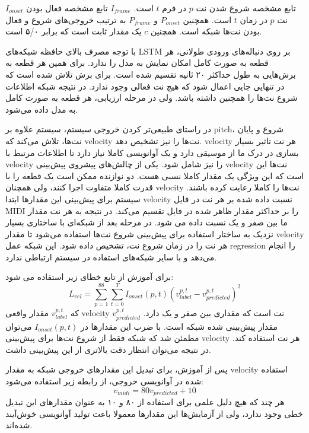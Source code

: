 $I_{onset}$ تابع مشخصه شروع شدن نت $p$ در فرم $t$ است. $I_{frame}$ تابع مشخصه
فعال بودن نت $p$ در زمان $t$ است. همچنین $P_{onset}$ و $P_{frame}$ به ترتیب
خروجی‌های شروع و فعال بودن نت‌ها شبکه است. همچنین $c$ یک مقدار ثابت است که برابر
۵/۰ است.

با توجه مصرف بالای حافظه شبکه‌های \gls{LSTM} بر روی دنباله‌های ورودی طولانی، هر
قطعه به صورت کامل امکان نمایش به مدل را ندارد. برای همین هر قطعه به برش‌هایی به
طول حداکثر ۲۰ ثانیه تقسیم شده است. برای برش تلاش شده است که در تنهایی جایی اعمال
شود که هیچ نت فعالی وجود ندارد. در نتیجه شبکه اطلاعات شروع نت‌ها را همچنین داشته
باشد. ولی در مرحله ارزیابی، هر قطعه به صورت کامل به مدل داده می‌شود.

در راستای طبیعی‌تر کردن خروجی سیستم، سیستم علاوه بر \gls{pitch}، شروع و پایان
نت‌ها، تلاش می‌کند که \gls{velocity} نت‌ها را نیز تشخیص دهد. \gls{velocity} هر
نت تاثیر بسیار بسازی در درک ما از موسیقی دارد و یک آوانویسی کاملا نیاز دارد تا
اطلاعات مرتبط با \gls{velocity} را نیز شامل شود. یکی از چالش‌های پیشروی پیش‌بینی
\gls{velocity} نت‌ها این است که این ویژگی یک مقدار کاملا نسبی هست. دو نوازنده
ممکن است یک قطعه را با قدرت کاملا متفاوت اجرا کنند، ولی همچنان \gls{velocity}
نت‌ها را کاملا رعایت کرده باشند. سیستم برای پیش‌بینی این مقدارها ابتدا
\gls{velocity} نسبت داده شده بر هر نت در فایل \gls{MIDI} را بر حداکثر مقدار ظاهر
شده در فایل تقسیم می‌کند. در نتیجه به هر نت مقدار ما بین صفر و یک نسبت داده می
شود. در مرحله بعد از شبکه‌ای با ساختاری بسیار نزدیک به ساختار استفاده برای
پیش‌بینی شروع نت‌ها استفاده می‌شود تا مقدار \gls{velocity} هر نت را در زمان شروع
نت، تشخیص داده شود. این شبکه عمل \gls{regression} را انجام می‌دهد و با سایر
شبکه‌های استفاده در سیستم ارتباطی ندارد.

برای آموزش از تابع خطای زیر استفاده می شود:
\begin{equation}
    L_{vel} = \sum_{p=1}^{88} \sum_{t=0}^{T} I_{onset}(p, t) (v_{label}^{p,t} - v_{predicted}^{p,t})^{2}
\end{equation}
که $v_{label}^{p, t}$ مقدار واقعی \gls{velocity} نت است که مقداری بین صفر و یک
دارد. $v_{predicted}^{p,t}$ مقدار پیش‌بینی شده شبکه است. با ضرب این مقدارها در
$I_{onset}(p, t)$ می‌توان مطمئن شد که شبکه فقط از شروع نت‌ها برای پیش‌بینی
\gls{velocity} هر نت استفاده کند. در نتیجه می‌توان انتظار دقت بالاتری از این پیش‌بینی داشت.

پس از آموزش، برای تبدیل این مقدارهای خروجی شبکه به مقدار \gls{velocity} استفاده
شده در آوانویسی خروجی، از رابطه زیر استفاده می‌شود:
\begin{equation}
    v_{midi} = 80 v_{predicted} + 10
\end{equation}
هر چند که هیچ دلیل علمی برای استفاده از ۸۰ و ۱۰ به عنوان مقدارهای این تبدیل خطی
وجود ندارد، ولی از آزمایش‌ها این مقدارها معمولا باعث تولید آوانویسی خوش‌آیند
شده‌اند.

